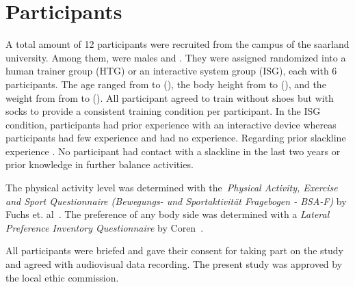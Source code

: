 \section{Participants}\label{6_participants}
A total amount of 12 participants were recruited from the campus of the saarland university. 
Among them,  were males and .
They were assigned randomized into a human trainer group (HTG) or an interactive system group (ISG), each with 6 participants.
The age ranged from  to  (), the body height from  to  (), and the weight from from  to  ().
All participant agreed to train without shoes but with socks to provide a consistent training condition per participant.
In the ISG condition,  participants had prior experience with an interactive device whereas  participants had few experience and  had no experience.
Regarding prior slackline experience .
No participant had contact with a slackline in the last two years or prior knowledge in further balance activities. 

The physical activity level was determined with the~\textit{Physical Activity, Exercise and Sport Questionnaire (Bewegungs- und Sportaktivität Fragebogen - BSA-F)} by Fuchs et. al~\cite{Fuchs2015-bsa}.
The preference of any body side was determined with a \textit{Lateral Preference Inventory Questionnaire} by Coren~\cite{Coren1993-lp}. 
 
All participants were briefed and gave their consent for taking part on the study and agreed with audiovisual data recording. The present study was approved by the local ethic commission.


